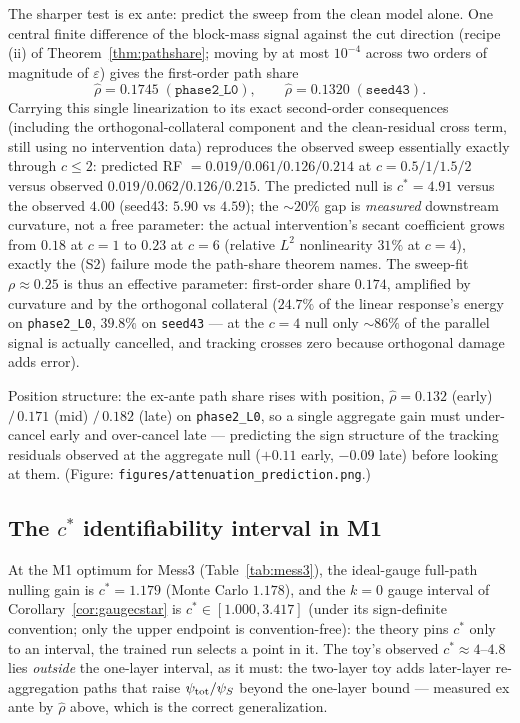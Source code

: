 \documentclass{article}
\begin{document}
The sharper test is ex ante: predict the sweep from the clean model alone. One central finite difference of the block-mass signal against the cut direction (recipe (ii) of Theorem~\ref{thm:pathshare}; moving by at most $10^{-4}$ across two orders of magnitude of $\varepsilon$) gives the first-order path share
\begin{equation}
    \hat\rho = 0.1745 \;(\texttt{phase2\_L0}), \qquad \hat\rho = 0.1320 \;(\texttt{seed43}) .
\end{equation}
Carrying this single linearization to its exact second-order consequences (including the orthogonal-collateral component and the clean-residual cross term, still using no intervention data) reproduces the observed sweep essentially exactly through $c \le 2$: predicted RF $= 0.019/0.061/0.126/0.214$ at $c = 0.5/1/1.5/2$ versus observed $0.019/0.062/0.126/0.215$. The predicted null is $c^* = 4.91$ versus the observed $4.00$ (seed43: $5.90$ vs $4.59$); the $\sim20\%$ gap is \emph{measured} downstream curvature, not a free parameter: the actual intervention's secant coefficient grows from $0.18$ at $c = 1$ to $0.23$ at $c = 6$ (relative $L^2$ nonlinearity $31\%$ at $c = 4$), exactly the (S2) failure mode the path-share theorem names. The sweep-fit $\rho \approx 0.25$ is thus an effective parameter: first-order share $0.174$, amplified by curvature and by the orthogonal collateral ($24.7\%$ of the linear response's energy on \texttt{phase2\_L0}, $39.8\%$ on \texttt{seed43} --- at the $c = 4$ null only $\sim86\%$ of the parallel signal is actually cancelled, and tracking crosses zero because orthogonal damage adds error).

Position structure: the ex-ante path share rises with position, $\hat\rho = 0.132$ (early) $/\,0.171$ (mid) $/\,0.182$ (late) on \texttt{phase2\_L0}, so a single aggregate gain must under-cancel early and over-cancel late --- predicting the sign structure of the tracking residuals observed at the aggregate null ($+0.11$ early, $-0.09$ late) before looking at them. (Figure: \texttt{figures/attenuation\_prediction.png}.)

\subsection{The $c^*$ identifiability interval in M1}

At the M1 optimum for Mess3 (Table~\ref{tab:mess3}), the ideal-gauge full-path nulling gain is $c^* = 1.179$ (Monte Carlo $1.178$), and the $k = 0$ gauge interval of Corollary~\ref{cor:gaugecstar} is $c^* \in [1.000, 3.417]$ (under its sign-definite convention; only the upper endpoint is convention-free): the theory pins $c^*$ only to an interval, the trained run selects a point in it. The toy's observed $c^* \approx 4$--$4.8$ lies \emph{outside} the one-layer interval, as it must: the two-layer toy adds later-layer re-aggregation paths that raise $\psi_{\mathrm{tot}}/\psi_S$ beyond the one-layer bound --- measured ex ante by $\hat\rho$ above, which is the correct generalization.
\end{document}
